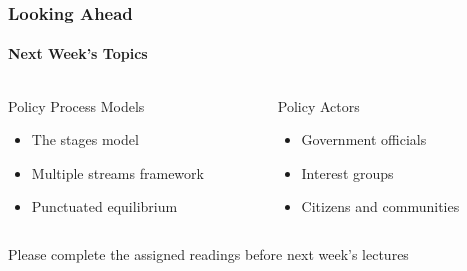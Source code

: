 \documentclass[10pt]{beamer}
\begin{document}
\begin{frame}
\frametitle{Looking Ahead}
\framesubtitle{Next Week's Topics}

\begin{columns}
\begin{column}{0.48\textwidth}
\begin{block}{Policy Process Models}
\begin{itemize}
\item The stages model
\item Multiple streams framework
\item Punctuated equilibrium
\end{itemize}
\end{block}
\end{column}

\begin{column}{0.48\textwidth}
\begin{block}{Policy Actors}
\begin{itemize}
\item Government officials
\item Interest groups
\item Citizens and communities
\end{itemize}
\end{block}
\end{column}
\end{columns}

\vspace{1cm}
\centering
Please complete the assigned readings before next week's lectures

\end{frame}
\end{document}
